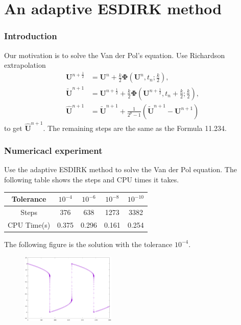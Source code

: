 \documentclass[9pt]{beamer}
\begin{document}
\section{An adaptive ESDIRK method}

\begin{frame}
  \frametitle{Introduction}

  Our motivation is to solve the Van der Pol's equation. Use Richardson extrapolation
  \begin{align*}
    \mathbf{U}^{n+\frac{1}{2}}&=\mathbf{U}^n+\frac{k}{2}\boldsymbol{\Phi}\left(\mathbf{U}^n,t_n;\frac{k}{2}\right),\\
    \tilde{\mathbf{U}}^{n+1}&=\mathbf{U}^{n+\frac{1}{2}}+\frac{k}{2}\boldsymbol{\Phi}\left(\mathbf{U}^{n+\frac{1}{2}},t_n+\frac{k}{2};\frac{k}{2}\right),\\
    \hat{\mathbf{U}}^{n+1}&=\tilde{\mathbf{U}}^{n+1}+\frac{1}{2^p-1}\left(\tilde{\mathbf{U}}^{n+1}-\mathbf{U}^{n+1}\right)
  \end{align*}
  to get $\hat{\mathbf{U}}^{n+1}$. The remaining steps are the same as the Formula 11.234.

\end{frame}

\begin{frame}
  \frametitle{Numericacl experiment}

  Use the adaptive ESDIRK method to solve the Van der Pol equation. The following table shows the steps and CPU times it takes.
  \begin{table}[H]
    \centering
    \begin{tabular}{c|cccc}
      Tolerance & $10^{-4}$ & $10^{-6}$ & $10^{-8}$ & $10^{-10}$ \\ \hline
      Steps & 376 & 638 & 1273 & 3382   \\
      CPU Time(s) & 0.375  & 0.296 & 0.161 & 0.254 
    \end{tabular}
  \end{table}
  
  The following figure is the solution with the tolerance $10^{-4}$.

  \begin{figure}
    \centering
    \includegraphics[width=0.4\textwidth]{pic/2-1.eps}
  \end{figure}

\end{frame}
\end{document}
